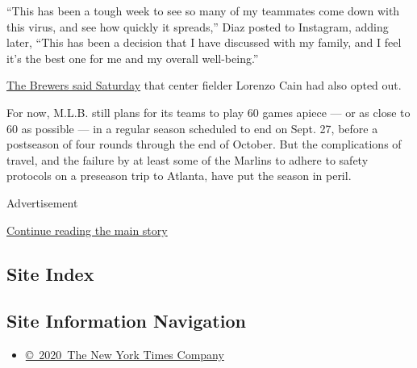 ``This has been a tough week to see so many of my teammates come down
with this virus, and see how quickly it spreads,'' Diaz posted to
Instagram, adding later, ``This has been a decision that I have
discussed with my family, and I feel it's the best one for me and my
overall well-being.''

\href{https://twitter.com/Brewers/status/1289605514196729856}{The
Brewers said Saturday} that center fielder Lorenzo Cain had also opted
out.

For now, M.L.B. still plans for its teams to play 60 games apiece --- or
as close to 60 as possible --- in a regular season scheduled to end on
Sept. 27, before a postseason of four rounds through the end of October.
But the complications of travel, and the failure by at least some of the
Marlins to adhere to safety protocols on a preseason trip to Atlanta,
have put the season in peril.

Advertisement

\protect\hyperlink{after-bottom}{Continue reading the main story}

\hypertarget{site-index}{%
\subsection{Site Index}\label{site-index}}

\hypertarget{site-information-navigation}{%
\subsection{Site Information
Navigation}\label{site-information-navigation}}

\begin{itemize}
\tightlist
\item
  \href{https://help.nytimes3xbfgragh.onion/hc/en-us/articles/115014792127-Copyright-notice}{©~2020~The
  New York Times Company}
\end{itemize}

